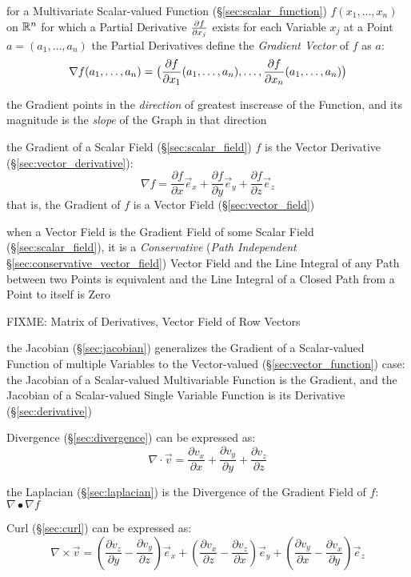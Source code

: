 for a Multivariate Scalar-valued Function (\S\ref{sec:scalar_function}) $f(x_1,
\ldots, x_n)$ on $\mathbb{R}^n$ for which a Partial Derivative $\frac{\partial{f}}{\partial{x_j}}$
exists for each Variable $x_j$ at a Point $a = (a_1, \ldots, a_n)$ the Partial
Derivatives define the \emph{Gradient Vector} of $f$ as $a$:
\[
  \nabla{f}(a_1, \ldots, a_n) = \big( \frac{\partial{f}}{\partial{x_1}}(a_1, \ldots, a_n), \ldots,
  \frac{\partial{f}}{\partial{x_n}}(a_1, \ldots, a_n) \big)
\]

the Gradient points in the \emph{direction} of greatest inscrease of the
Function, and its magnitude is the \emph{slope} of the Graph in that direction

the Gradient of a Scalar Field (\S\ref{sec:scalar_field}) $f$ is the Vector
Derivative (\S\ref{sec:vector_derivative}):
\[
  \nabla f =
    \frac{\partial f}{\partial x}\vec{e}_x +
    \frac{\partial f}{\partial y}\vec{e}_y +
    \frac{\partial f}{\partial z}\vec{e}_z
\]
that is, the Gradient of $f$ is a Vector Field (\S\ref{sec:vector_field})

when a Vector Field is the Gradient Field of some Scalar Field
(\S\ref{sec:scalar_field}), it is a \emph{Conservative} (\emph{Path
  Independent} \S\ref{sec:conservative_vector_field}) Vector Field and the Line
Integral of any Path between two Points is equivalent and the Line Integral of
a Closed Path from a Point to itself is Zero

FIXME: Matrix of Derivatives, Vector Field of Row Vectors

the Jacobian (\S\ref{sec:jacobian}) generalizes the Gradient of a Scalar-valued
Function of multiple Variables to the Vector-valued
(\S\ref{sec:vector_function}) case: the Jacobian of a Scalar-valued
Multivariable Function is the Gradient, and the Jacobian of a Scalar-valued
Single Variable Function is its Derivative (\S\ref{sec:derivative})

Divergence (\S\ref{sec:divergence}) can be expressed as:
\[
  \nabla \cdot \vec{v} =
    \frac{\partial v_x}{\partial x} +
    \frac{\partial v_y}{\partial y} +
    \frac{\partial v_z}{\partial z}
\]

the Laplacian (\S\ref{sec:laplacian}) is the Divergence of the Gradient Field
of $f$: $\nabla \bullet \nabla f$

Curl (\S\ref{sec:curl}) can be expressed as:
\[
  \nabla\times\vec{v} =
    (\frac{\partial v_z}{\partial y}-\frac{\partial v_y}{\partial z})\vec{e}_x +
    (\frac{\partial v_x}{\partial z}-\frac{\partial v_z}{\partial x})\vec{e}_y +
    (\frac{\partial v_y}{\partial x}-\frac{\partial v_x}{\partial y})\vec{e}_z
\]

